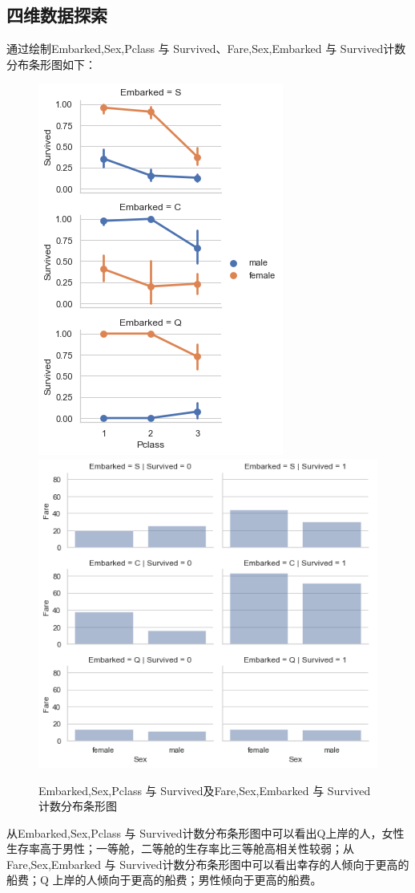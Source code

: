 \subsection{四维数据探索}
通过绘制Embarked,Sex,Pclass 与 Survived、Fare,Sex,Embarked 与 Survived计数分布条形图如下：
\begin{figure}[H]
	\centering
	\includegraphics[scale=0.5,angle=0]{images/11.png}	\includegraphics[scale=0.5,angle=0]{images/12.png}
	\caption{Embarked,Sex,Pclass 与 Survived及Fare,Sex,Embarked 与 Survived计数分布条形图}
	\label{11}
\end{figure}
	从Embarked,Sex,Pclass 与 Survived计数分布条形图中可以看出Q上岸的人，女性生存率高于男性；一等舱，二等舱的生存率比三等舱高相关性较弱；从Fare,Sex,Embarked 与 Survived计数分布条形图中可以看出幸存的人倾向于更高的船费；Q 上岸的人倾向于更高的船费；男性倾向于更高的船费。
\clearpage

